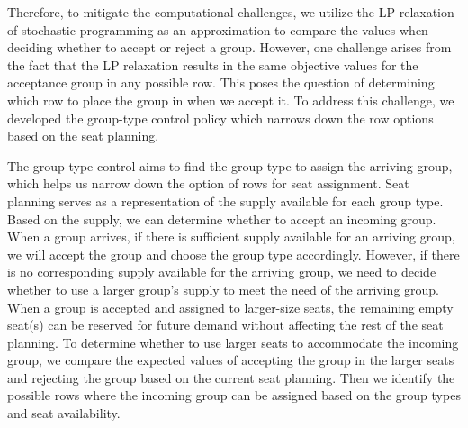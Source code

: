 Therefore, to mitigate the computational challenges, we utilize the LP relaxation of stochastic programming as an approximation to compare the values when deciding whether to accept or reject a group. However, one challenge arises from the fact that the LP relaxation results in the same objective values for the acceptance group in any possible row. This poses the question of determining which row to place the group in when we accept it. To address this challenge, we developed the group-type control policy which narrows down the row options based on the seat planning.

The group-type control aims to find the group type to assign the arriving group, which helps us narrow down the option of rows for seat assignment. Seat planning serves as a representation of the supply available for each group type. Based on the supply, we can determine whether to accept an incoming group. When a group arrives, if there is sufficient supply available for an arriving group, we will accept the group and choose the group type accordingly. However, if there is no corresponding supply available for the arriving group, we need to decide whether to use a larger group's supply to meet the need of the arriving group. When a group is accepted and assigned to larger-size seats, the remaining empty seat(s) can be reserved for future demand without affecting the rest of the seat planning. To determine whether to use larger seats to accommodate the incoming group, we compare the expected values of accepting the group in the larger seats and rejecting the group based on the current seat planning. Then we identify the possible rows where the incoming group can be assigned based on the group types and seat availability.


